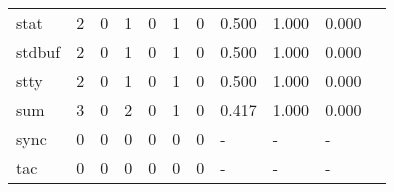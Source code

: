 \begin{longtable}{lp{1.20cm}p{1.20cm}p{1.20cm}p{1.20cm}p{1.20cm}p{1.20cm}p{1.20cm}p{1.20cm}p{1.20cm}p{1.20cm}}
stat      &                                     2 &                                                  0 &                                                  1 &                                                  0 &                                                  1 &                                                  0 &                                         0.500 &                                              1.000 &                                              0.000 \\
stdbuf    &                                     2 &                                                  0 &                                                  1 &                                                  0 &                                                  1 &                                                  0 &                                         0.500 &                                              1.000 &                                              0.000 \\
stty      &                                     2 &                                                  0 &                                                  1 &                                                  0 &                                                  1 &                                                  0 &                                         0.500 &                                              1.000 &                                              0.000 \\
sum       &                                     3 &                                                  0 &                                                  2 &                                                  0 &                                                  1 &                                                  0 &                                         0.417 &                                              1.000 &                                              0.000 \\
sync      &                                     0 &                                                  0 &                                                  0 &                                                  0 &                                                  0 &                                                  0 &                                             - &                                                  - &                                                  - \\
tac       &                                     0 &                                                  0 &                                                  0 &                                                  0 &                                                  0 &                                                  0 &                                             - &                                                  - &                                                  - \\

\end{longtable}
